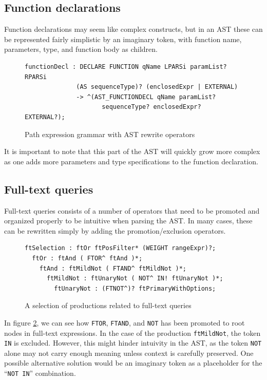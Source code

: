 \subsection{Function declarations}
Function declarations may seem like complex constructs, but in an AST these can
be represented fairly simplistic by an imaginary token, with function name, 
parameters, type, and function body as children.

\begin{figure}[h!]
\begin{verbatim} 
functionDecl : DECLARE FUNCTION qName LPARSi paramList? RPARSi 
              (AS sequenceType)? (enclosedExpr | EXTERNAL)
              -> ^(AST_FUNCTIONDECL qName paramList? 
                     sequenceType? enclosedExpr? EXTERNAL?);
\end{verbatim}
\caption{Path expression grammar with AST rewrite operators}
\label{code:ast:funcdecl1}
\end{figure}

It is important to note that this part of the AST will quickly grow more complex
as one adds more parameters and type specifications to the function declaration.

\subsection{Full-text queries}
Full-text queries consists of a number of operators that need to be promoted and
organized properly to be intuitive when parsing the AST. In many cases, these
can be rewritten simply by adding the promotion/exclusion operators. 

\begin{figure}[h!]
\begin{verbatim} 
ftSelection : ftOr ftPosFilter* (WEIGHT rangeExpr)?;
  ftOr : ftAnd ( FTOR^ ftAnd )*;
    ftAnd : ftMildNot ( FTAND^ ftMildNot )*;
      ftMildNot : ftUnaryNot ( NOT^ IN! ftUnaryNot )*;
        ftUnaryNot : (FTNOT^)? ftPrimaryWithOptions;
\end{verbatim}
\caption{A selection of productions related to full-text queries}
\label{code:ast:ft_op}
\end{figure}

In figure \ref{code:ast:ft_op}, we can see how \verb!FTOR!, \verb!FTAND!, and \verb!NOT! 
has been promoted to root nodes in full-text expressions. In the case of the
production \verb!ftMildNot!, the token \verb!IN! is excluded. However, this
might hinder intuivity in the AST, as the token \verb!NOT! alone may not carry
enough meaning unless context is carefully preserved. One possible alternative
solution would be an imaginary token as a placeholder for the ``\verb!NOT IN!''
combination. 

